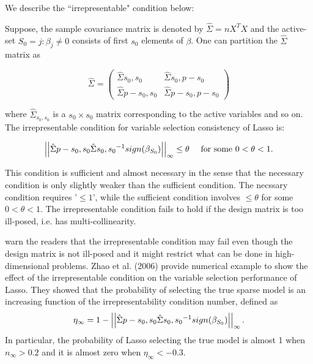 \documentclass[10pt]{article}
\begin{document}
We describe the ``irrepresentable" condition below:\par Suppose, the sample covariance matrix is denoted by $\hat{\Sigma} = nX^T X$ and the active-set $S_0 = { j : \beta_j \neq 0}$ consists of first $s_0$ elements of $\beta$. One can partition the $\hat{\Sigma}$ matrix as

$$ \hat{\Sigma} = \left(\begin{array}{cc}
\hat{\Sigma}{s_0,s_0} & \hat{\Sigma}{s_0,p-s_0} \\ \hat{\Sigma}{p-s_0,s_0} & \hat{\Sigma}{p-s_0,p-s_0} \end{array} \right) $$

where $\hat{\Sigma}_{s_0,s_0}$ is a $s_0\times s_0$ matrix corresponding to the active variables and so on. The irrepresentable condition for variable selection consistency of Lasso is:

$$ \left|\left|\hat{\Sigma}{p-s_0,s_0} \hat{\Sigma}{s_0,s_0}^{-1} sign(\beta_{S_0})\right|\right|_{\infty} \leq \theta \quad \mbox{ for some } 0 < \theta < 1 .$$

This condition is sufficient and almost necessary in the sense that the necessary condition is only slightly weaker than the sufficient condition. The necssary condition requires '$\leq 1$', while the sufficient condition involves $\leq \theta$ for some $0 < \theta < 1$. The irrepresentable condition fails to hold if the design matrix is too ill-posed, i.e. has multi-collinearity.

\citep{buhlmann2011statistics} warn the readers that the irrepresentable condition may fail even though the design matrix is not ill-posed and it might restrict what can be done in high-dimensional problems. Zhao et al. (2006) provide numerical example to show the effect of the irrepresentable condition on the variable selection performance of Lasso. They showed that the probability of selecting the true sparse model is an increasing function of the irrepresentability condition number, defined as $$ \eta_{\infty} = 1 - \left|\left| \hat{\Sigma}{p-s_0,s_0} \hat{\Sigma}{s_0,s_0}^{-1} sign(\beta_{S_0}) \right|\right|_{\infty} . $$ In particular, the probability of Lasso selecting the true model is almost 1 when $n_{\infty} > 0.2$ and it is almost zero when $\eta_{\infty} < -0.3$.
\end{document}

